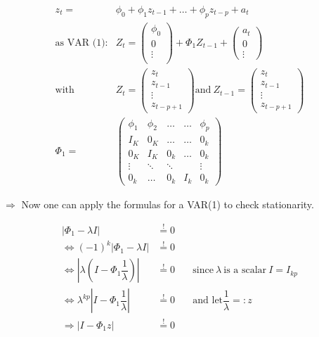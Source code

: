 \documentclass[12pt,a4paper]{article}
\begin{document}
\begin{align*}
  z_t = & \phi_0  + \phi_1 z_{t-1} + \ldots + \phi_p z_{t - p} + a_t\\
  \text{as VAR (1):} & Z_t = \begin{pmatrix} \phi_0 \\ 
  0\\
  \vdots \\
  \end{pmatrix} + 
  \Phi_1 Z_{t - 1} +
  \begin{pmatrix} 
  a_t \\  
  0\\
  \vdots 
  \end{pmatrix}\\
  \text{with} & Z_t =   
  \begin{pmatrix} 
   z_t \\
   z_{t-1} \\
   \vdots \\
   z_{t-p+1}
  \end{pmatrix}
  \text{and} \ Z_{t-1} = 
  \begin{pmatrix} 
   z_t \\
   z_{t-1} \\
   \vdots \\
   z_{t-p+1}
  \end{pmatrix}\\
  \Phi_1 = &
  \begin{pmatrix}
  \phi_1 & \phi_2 & \ldots  & \ldots & \phi_p \\
  I_K & 0_K & \ldots & \ldots & 0_k\\
  0_K & I_K & 0_k & \ldots & 0_k\\
  \vdots & \ddots & \ddots &  & \vdots\\
  0_k & \ldots &  0_k & I_k & 0_k
  \end{pmatrix}
\end{align*}

\(\Rightarrow\) Now one can apply the formulas for a VAR(1) to check
stationarity.

\begin{align*}
\left| \Phi_1 - \lambda I \right| & \overset{!}{=} 0 \\
\Leftrightarrow (-1)^k \left| \Phi_1 - \lambda I \right| & \overset{!}{=} 0 \\
\Leftrightarrow \left| \lambda \left( I -  \Phi_1 \dfrac{1}{\lambda} \right)  \right| & \overset{!}{=} 0 \quad &  \text{since} \ \lambda \ \text{is a scalar} \ I = I_{kp} \\ 
\Leftrightarrow  \lambda^{kp} \left| I - \Phi_{1} \dfrac{1}{\lambda} \right|  & \overset{!}{=} 0 \quad & \text{and let} \dfrac{1}{\lambda} =: z \\
\Rightarrow \left| I - \Phi_1 z \right| & \overset{!}{=} 0 
\end{align*}
\end{document}
